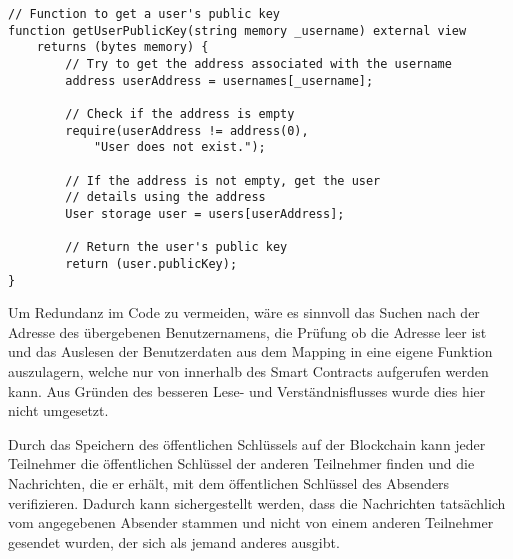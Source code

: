 \begin{lstlisting}[language=Solidity, caption={Suche nach einem öffentlichen Schlüssel auf der Blockchain},captionpos=b]
// Function to get a user's public key
function getUserPublicKey(string memory _username) external view 
    returns (bytes memory) {
        // Try to get the address associated with the username
        address userAddress = usernames[_username];

        // Check if the address is empty
        require(userAddress != address(0), 
            "User does not exist.");

        // If the address is not empty, get the user 
        // details using the address
        User storage user = users[userAddress];

        // Return the user's public key
        return (user.publicKey);
}
\end{lstlisting}

\noindent Um Redundanz im Code zu vermeiden, wäre es sinnvoll das Suchen nach der Adresse des übergebenen Benutzernamens, die Prüfung ob die Adresse leer ist und das Auslesen der Benutzerdaten aus dem Mapping in eine eigene Funktion auszulagern, welche nur von innerhalb des Smart Contracts aufgerufen werden kann. Aus Gründen des besseren Lese- und Verständnisflusses wurde dies hier nicht umgesetzt.

Durch das Speichern des öffentlichen Schlüssels auf der Blockchain kann jeder Teilnehmer die öffentlichen Schlüssel der anderen Teilnehmer finden und die Nachrichten, die er erhält, mit dem öffentlichen Schlüssel des Absenders verifizieren. Dadurch kann sichergestellt werden, dass die Nachrichten tatsächlich vom angegebenen Absender stammen und nicht von einem anderen Teilnehmer gesendet wurden, der sich als jemand anderes ausgibt.



